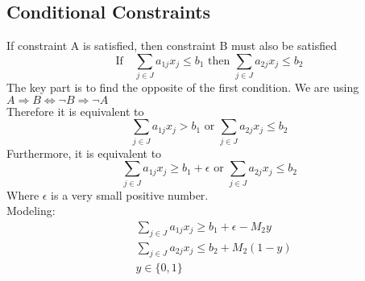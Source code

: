 				\subsection{Conditional Constraints}
					If constraint A is satisfied, then constraint B must also be satisfied
					\begin{equation}
						\text{If} \quad \sum_{j\in J} a_{1j} x_j \le b_1 \text{ then } \sum_{j\in J} a_{2j} x_j \le b_2 
					\end{equation}
					The key part is to find the opposite of the first condition. We are using $A\Rightarrow B \Leftrightarrow \neg B \Rightarrow \neg A$\\
					Therefore it is equivalent to
					\begin{equation}
						\sum_{j\in J} a_{1j} x_j > b_1 \text{ or } \sum_{j\in J} a_{2j} x_j \le b_2 
					\end{equation}
					Furthermore, it is equivalent to
					\begin{equation}
						\sum_{j\in J} a_{1j} x_j \ge b_1 + \epsilon \text{ or } \sum_{j\in J} a_{2j} x_j \le b_2 
					\end{equation}
					Where $\epsilon$ is a very small positive number.\\
					Modeling:
					\begin{align}
						& \sum_{j\in J} a_{1j} x_j \ge b_1 + \epsilon -  M_2y  \\
						& \sum_{j\in J} a_{2j} x_j \le b_2 + M_2(1-y)  \\
						& y \in \{0, 1\} 
					\end{align}

